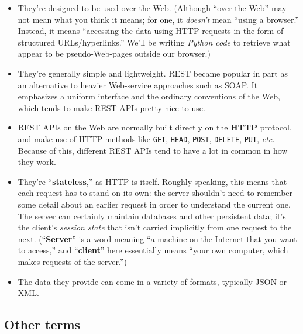 \begin{itemize}
\itemsep.1em


\item They're designed to be used over the Web. (Although ``over the Web'' may
not mean what you think it means; for one, it \textit{doesn't} mean ``using a
browser.'' Instead, it means ``accessing the data using HTTP requests in the
form of structured URLs/hyperlinks.'' We'll be writing \textit{Python code} to
retrieve what appear to be pseudo-Web-pages outside our browser.)


\item They're generally simple and lightweight. REST became popular in part
as an alternative to heavier Web-service approaches such as SOAP. It emphasizes
a uniform interface and the ordinary conventions of the Web, which tends to
make REST APIs pretty nice to use.


\item REST APIs on the Web are normally built directly on the \textbf{HTTP}
protocol, and make use of HTTP methods like \texttt{GET}, \texttt{HEAD},
\texttt{POST}, \texttt{DELETE}, \texttt{PUT}, \textit{etc.} Because of this,
different REST APIs tend to have a lot in common in how they work.


\item They're ``\textbf{stateless},'' as HTTP is itself. Roughly speaking,
this means that each request has to stand on its own: the server shouldn't
need to remember some detail about an earlier request in order to understand
the current one. The server can certainly maintain databases and other
persistent data; it's the client's \textit{session state} that isn't carried
implicitly from one request to the next. (``\textbf{Server}'' is a word
meaning ``a machine on the Internet that you want to access,'' and
``\textbf{client}'' here essentially means ``your own computer, which makes
requests of the server.'')

\item The data they provide can come in a variety of formats, typically JSON
or XML.

\end{itemize}

\subsection{Other terms}

